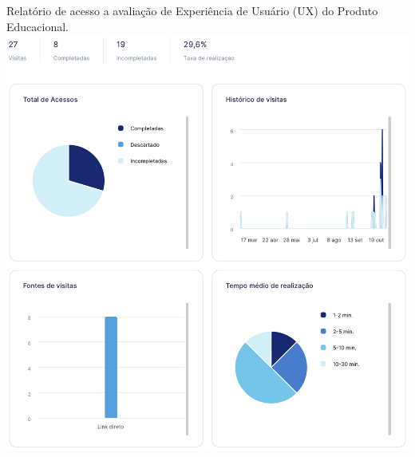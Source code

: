 \begin{anexosenv}
\newpage
\begin{center}
    Relatório de acesso a avaliação de Experiência de Usuário (UX) do Produto Educacional.
    \newline
    \newline
    \includegraphics[width=\textwidth]{pos-textuais/anexo_ux.png}
\end{center}

\end{anexosenv}
